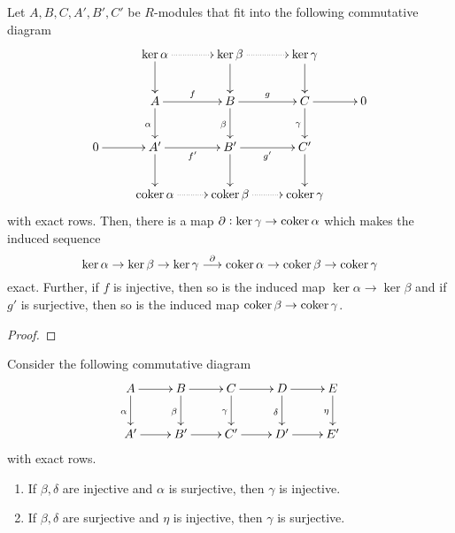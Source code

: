\begin{theorem}
    Let $A,B,C,A',B',C'$ be $R$-modules that fit into the following commutative diagram
    \begin{equation*}
        \xymatrix {
            & \ker\alpha\ar[d]\ar@{.>}[r] & \ker\beta\ar[d]\ar@{.>}[r] & \ker\gamma\ar[d]\\
            & A\ar[r]^f\ar[d]_\alpha & B\ar[r]^g\ar[d]_\beta & C\ar[r]\ar[d]_\gamma & 0\\
            0\ar[r] & A'\ar[r]_{f'}\ar[d] & B'\ar[r]_{g'}\ar[d] & C'\ar[d] &\\
            & \coker\alpha\ar@{.>}[r] & \coker\beta\ar@{.>}[r] & \coker\gamma
        }
    \end{equation*}
    with exact rows. Then, there is a map $\partial:\ker\gamma\to\operatorname{coker}\alpha$ which makes the induced sequence 
    \begin{equation*}
        \ker\alpha\to\ker\beta\to\ker\gamma\stackrel{\partial}{\longrightarrow}\operatorname{coker}\alpha\to\operatorname{coker}\beta\to\operatorname{coker}\gamma
    \end{equation*}
    exact. Further, if $f$ is injective, then so is the induced map $\ker\alpha\to\ker\beta$ and if $g'$ is surjective, then so is the induced map $\operatorname{coker}\beta\to\operatorname{coker}\gamma$.
\end{theorem}
\begin{proof}
    
\end{proof}

\begin{corollary}
    Consider the following commutative diagram
    \begin{equation*}
        \xymatrix {
            A\ar[d]_\alpha\ar[r] & B\ar[d]_\beta\ar[r] & C\ar[d]_\gamma\ar[r] & D\ar[d]_\delta\ar[r] & E\ar[d]_\eta\\
            A'\ar[r] & B'\ar[r] & C'\ar[r] & D'\ar[r] & E'
        }
    \end{equation*}
    with exact rows. 
    \begin{enumerate}[label=(\alph*)]
        \item If $\beta,\delta$ are injective and $\alpha$ is surjective, then $\gamma$ is injective.
        \item If $\beta,\delta$ are surjective and $\eta$ is injective, then $\gamma$ is surjective.
    \end{enumerate}
\end{corollary}

